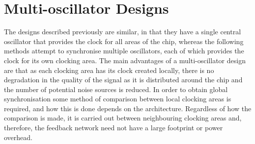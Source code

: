 \section{Multi-oscillator Designs}
The designs described previously are similar, in that they have a single central oscillator that provides the clock for all areas of the chip, whereas the following methods attempt to synchronise multiple oscillators, each of which provides the clock for its own clocking area. The main advantages of a multi-oscillator design are that as each clocking area has its clock created locally, there is no degradation in the quality of the signal as it is distributed around the chip and the number of potential noise sources is reduced. In order to obtain global synchronisation some method of comparison between local clocking areas is required, and how this is done depends on the architecture. Regardless of how the comparison is made, it is carried out between neighbouring clocking areas and, therefore, the feedback network need not have a large footprint or power overhead.

